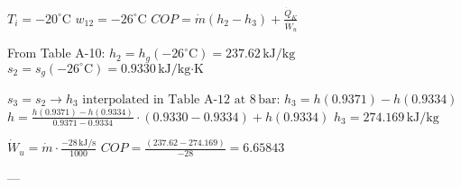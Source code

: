 \( T_i = -20^\circ \text{C} \)  
\( w_{12} = -26^\circ \text{C} \)  
\( COP = \dot{m} (h_2 - h_3) + \frac{\dot{Q}_K}{\dot{W}_u} \)  

From Table A-10:  
\( h_2 = h_g(-26^\circ \text{C}) = 237.62 \, \text{kJ/kg} \)  
\( s_2 = s_g(-26^\circ \text{C}) = 0.9330 \, \text{kJ/kg·K} \)  

\( s_3 = s_2 \rightarrow h_3 \text{ interpolated in Table A-12 at } 8 \, \text{bar} \):  
\( h_3 = h(0.9371) - h(0.9334) \)  
\( h = \frac{h(0.9371) - h(0.9334)}{0.9371 - 0.9334} \cdot (0.9330 - 0.9334) + h(0.9334) \)  
\( h_3 = 274.169 \, \text{kJ/kg} \)  

\( \dot{W}_u = \dot{m} \cdot \frac{-28 \, \text{kJ/s}}{1000} \)  
\( COP = \frac{(237.62 - 274.169)}{-28} = 6.65843 \)  

---